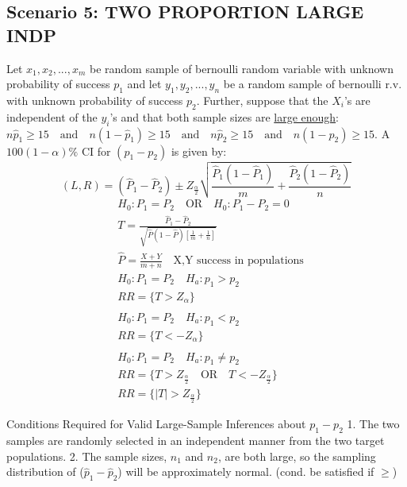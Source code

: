 \documentclass[fontsize=6pt, paper=a4]{scrartcl}
\begin{document}
\begin{multicols*}{4}
{\subsection{Scenario 5: TWO PROPORTION LARGE INDP}
Let $x_1,x_2,...,x_m$ be random sample of bernoulli random variable with unknown probability of success $p_1$ and let $y_1,y_2,...,y_n$ be a random sample of bernoulli r.v. with unknown probability of success $p_2$. Further, suppose that the $X_i$'s are independent of the $y_i$'s and that both sample sizes are \underline{large enough}:$n\widehat{p}_1 \geq  15 \quad \textrm{and} \quad
	n(1-\widehat{p}_1) \geq  15 \quad \textrm{and} \quad n\widehat{p}_2 \geq  15 \quad \textrm{and} \quad
	n(1-\widehat{p}_2) \geq  15$. A $100(1-\alpha)\%$ CI for $(p_1-p_2)$ is given by:
\begin{equation}
	(L,R)=(\widehat{P}_1-\widehat{P}_2)\pm Z_{\frac{\alpha}{2}}\sqrt{\frac{\widehat{P}_1(1-\widehat{P}_1)}{m}+\frac{\widehat{P}_2(1-\widehat{P}_2)}{n}}
\end{equation} 
\begin{align}
	&H_0:P_1=P_2 \quad \textrm{OR} \quad H_0:P_1-P_2=0\\
	&T=\frac{\widehat{P}_1-\widehat{P}_2}{\sqrt{\widehat{P}(1-\widehat{P})[\frac{1}{m}+\frac{1}{n}]}}\\
	&\widehat{P}=\frac{X+Y}{m+n} \quad \textrm{X,Y success in populations}\\
	&H_0:P_1=P_2 \quad H_a:p_1 >p_2\\
	&RR= \{ T> Z_\alpha \}\\ \\
	&H_0:P_1=P_2 \quad H_a:p_1 <p_2\\
	&RR= \{ T< -Z_\alpha \}\\ \\
	&H_0:P_1=P_2 \quad H_a:p_1 \neq p_2\\
	&RR= \{ T> Z_{\frac{\alpha}{2}} \quad \textrm{OR} \quad T<- Z_{\frac{\alpha}{2}} \} \\
	&RR= \{ \left|T\right|> Z_{\frac{\alpha}{2}}\}
\end{align}
  
Conditions Required for Valid Large-Sample Inferences about $p_1-p_2$
1. The two samples are randomly selected in an independent manner from the two
target populations.
2. The sample sizes, $n_1$ and $n_2$, are both large, so the sampling distribution of ($\widehat{p}_1-\widehat{p}_2$) will be approximately normal. (cond. be satisfied if $\geq$)
}
\end{multicols*}
\end{document}
